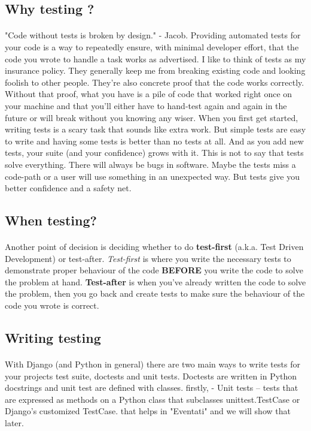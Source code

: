 \documentclass[12pt,a4paper,class,twoside,openany]{report}
\begin{document}
{\subsection{Why testing ?}
\paragraph*{\hspace{.9 cm} } "Code without tests is broken by design." - Jacob.
Providing automated tests for your code is a way to repeatedly ensure, with minimal developer effort, that the code you wrote to handle a task works as advertised. I like to think of tests as my insurance policy. They generally keep me from breaking existing code and looking foolish to other people. They're also concrete proof that the code works correctly. Without that proof, what you have is a pile of code that worked right once on your machine and that you'll either have to hand-test again and again in the future or will break without you knowing any wiser.
When you first get started, writing tests is a scary task that sounds like extra work. But simple tests are easy to write and having some tests is better than no tests at all. And as you add new tests, your suite (and your confidence) grows with it.
This is not to say that tests solve everything. There will always be bugs in software. Maybe the tests miss a code-path or a user will use something in an unexpected way. But tests give you better confidence and a safety net.
\subsection{When testing? }
\paragraph*{\hspace{.9 cm} } Another point of decision is deciding whether to do \textbf{test-first} (a.k.a. Test Driven Development) or test-after. \emph{Test-first} is where you write the necessary tests to demonstrate proper behaviour of the code \textbf{BEFORE} you write the code to solve the problem at hand. \textbf{Test-after} is when you've already written the code to solve the problem, then you go back and create tests to make sure the behaviour of the code you wrote is correct.
\subsection{Writing testing}
\paragraph*{\hspace{.9 cm} } With Django (and Python in general) there are two main ways to write tests for your projects test suite, doctests and unit tests.
Doctests are written in Python docstrings and unit test are defined with classes.
firstly, - Unit tests – tests that are expressed as methods on a Python class that subclasses unittest.TestCase or Django’s customized TestCase. that helps in "Eventati" and we will show that later.

}
\end{document}
